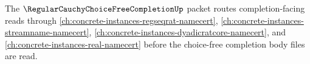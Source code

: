 \noindent The $\RegularCauchyChoiceFreeCompletionUp$ packet routes completion-facing reads through \autoref{ch:concrete-instances-regseqrat-namecert}, \autoref{ch:concrete-instances-streamname-namecert}, \autoref{ch:concrete-instances-dyadicratcore-namecert}, and \autoref{ch:concrete-instances-real-namecert} before the choice-free completion body files are read.






